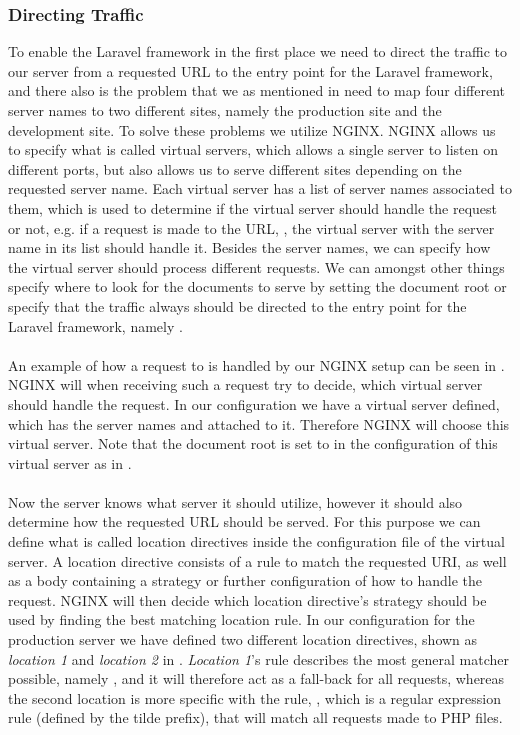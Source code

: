 \subsubsection{Directing Traffic}
\label{ssub:directing_traffic}
To enable the Laravel framework in the first place we need to direct the traffic to our server from a requested URL to the entry point for the Laravel framework, and there also is the problem that we as mentioned in  need to map four different server names to two different sites, namely the production site and the development site. To solve these problems we utilize NGINX. NGINX allows us to specify what is called virtual servers, which allows a single server to listen on different ports, but also allows us to serve different sites depending on the requested server name. Each virtual server has a list of server names associated to them, which is used to determine if the virtual server should handle the request or not, e.g. if a request is made to the URL, , the virtual server with the server name  in its list should handle it. 
Besides the server names, we can specify how the virtual server should process different requests. We can amongst other things specify where to look for the documents to serve by setting the document root or specify that the traffic always should be directed to the entry point for the Laravel framework, namely . 
\\\\
An example of how a request to  is handled by our NGINX setup can be seen in . NGINX will when receiving such a request try to decide, which virtual server should handle the request. In our configuration we have a virtual server defined, which has the server names  and  attached to it. Therefore NGINX will choose this virtual server. Note that the document root is set to  in the configuration of this virtual server as in .
\\\\ %
Now the server knows what server it should utilize, however it should also determine how the requested URL should be served. For this purpose we can define what is called location directives inside the configuration file of the virtual server. A location directive consists of a rule to match the requested URI, as well as a body containing a strategy or further configuration of how to handle the request. NGINX will then decide which location directive's strategy should be used by finding the best matching location rule. In our configuration for the production server we have defined two different location directives, shown as \emph{location 1} and \emph{location 2} in . \emph{Location 1}'s rule describes the most general matcher possible, namely , and it will therefore act as a fall-back for all requests, whereas the second location is more specific with the rule, , which is a regular expression rule (defined by the tilde prefix), that will match all requests made to PHP files. 
